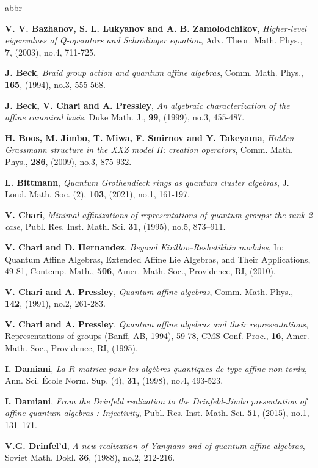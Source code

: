 \documentclass[11pt]{amsart}
\theoremstyle{definition}
\theoremstyle{remark}
\numberwithin{equation}{section}
\begin{document}
\begin{thebibliography}{abbr}
{ {\bf V. V. Bazhanov, S. L. Lukyanov and A. B. Zamolodchikov}, {\it Higher-level eigenvalues of Q-operators and Schrödinger equation}, Adv. Theor. Math. Phys., \textbf{7}, (2003), no.4, 711-725.

 {\bf J. Beck}, {\it Braid group action and quantum affine algebras}, Comm. Math. Phys., \textbf{165}, (1994), no.3, 555-568.

 {\bf J. Beck, V. Chari and A. Pressley}, {\it An algebraic characterization of the affine canonical basis}, Duke Math. J., \textbf{99}, (1999), no.3, 455-487.

 {\bf H. Boos, M. Jimbo, T. Miwa, F. Smirnov and Y. Takeyama}, {\it Hidden Grassmann structure in the XXZ model II: creation operators}, Comm. Math. Phys., \textbf{286}, (2009), no.3, 875-932.

 {\bf L. Bittmann}, {\it Quantum Grothendieck rings as quantum cluster algebras}, J. Lond. Math. Soc. (2), \textbf{103}, (2021), no.1, 161-197.

 {\bf V. Chari}, {\it Minimal affinizations of representations of quantum groups: the rank 2 case}, Publ. Res. Inst. Math. Sci. \textbf{31}, (1995), no.5, 873–911.

 {\bf V. Chari and D. Hernandez}, {\it Beyond Kirillov--Reshetikhin modules}, 	In: Quantum Affine Algebras, Extended Affine Lie Algebras, and Their Applications, 49-81, Contemp. Math., \textbf{506}, Amer. Math. Soc., Providence, RI, (2010).

 {\bf V. Chari and A. Pressley}, {\it Quantum affine algebras}, Comm. Math. Phys., \textbf{142}, (1991), no.2, 261-283.

 {\bf V. Chari and A. Pressley}, {\it Quantum affine algebras and their representations}, Representations of groups (Banff, AB, 1994), 59-78, CMS Conf. Proc., \textbf{16}, Amer. Math. Soc., Providence, RI, (1995).

 {\bf I. Damiani}, {\it La $R$-matrice pour les algèbres quantiques de type affine non tordu}, Ann. Sci. École Norm. Sup. (4), \textbf{31}, (1998), no.4, 493-523.

 {\bf I. Damiani}, {\it From the Drinfeld realization to the Drinfeld-Jimbo presentation of affine quantum algebras : Injectivity},
Publ. Res. Inst. Math. Sci. \textbf{51}, (2015), no.1, 131–171.

 {\bf V.G. Drinfel'd}, {\it A new realization of Yangians and of quantum affine algebras}, {Soviet Math. Dokl. \textbf{36}, (1988), no.2, 212-216.}

}
\end{thebibliography}
\end{document}
